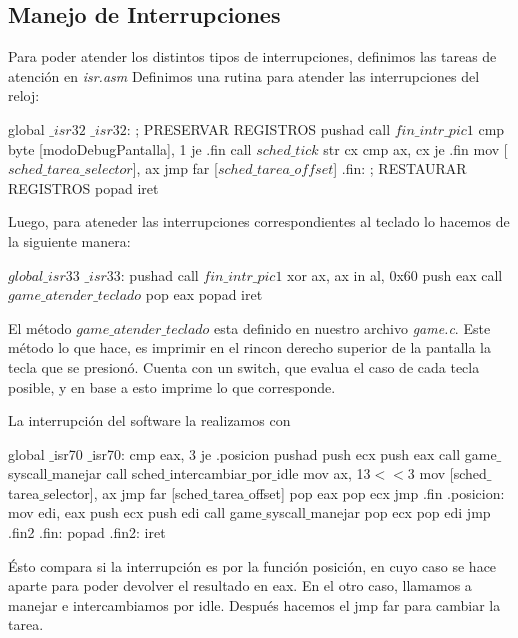 \subsection{Manejo de Interrupciones}
Para poder atender los distintos tipos de interrupciones, definimos las tareas de atenci\'on en \textit{isr.asm}
Definimos una rutina para atender las interrupciones del reloj:
\begin{algorithmic}
    \State \tab global $\_isr32$
\State \tab $\_isr32$:
  \State \tab \tab; PRESERVAR REGISTROS
  \State \tab \tab pushad
  \State \tab \tab call $fin\_intr\_pic1$
  \State \tab \tab cmp byte [modoDebugPantalla], 1
  \State \tab \tab je .fin
\State \tab \tab  call $sched\_tick$
  \State \tab \tab str cx
  \State \tab \tab cmp ax, cx
  \State \tab \tab je .fin
  \State \tab \tab mov [$sched\_tarea\_selector$], ax
  \State \tab \tab jmp far [$sched\_tarea\_offset$]
\State \tab \tab .fin:
  \State \tab \tab ; RESTAURAR REGISTROS
  \State \tab \tab popad
  \State \tab \tab iret
\end{algorithmic}

Luego, para ateneder las interrupciones correspondientes al teclado lo hacemos de la siguiente manera:
\begin{algorithmic}
    \State \tab $global \_isr33$
\State \tab \tab $\_isr33$:
  \State \tab \tab pushad
  \State \tab \tab call $fin\_intr\_pic1$
  \State \tab \tab xor ax, ax
  \State \tab \tab in al, 0x60
  \State \tab \tab push eax
  \State \tab \tab call $game\_atender\_teclado$
  \State \tab \tab pop eax
  \State \tab \tab popad
  \State \tab \tab iret
\end{algorithmic}

El m\'etodo \textit{$game\_atender\_teclado$} esta definido en nuestro archivo \textit{game.c}. Este m\'etodo lo que hace, es imprimir en el rincon derecho superior de la pantalla la tecla que se presion\'o.
Cuenta con un switch, que evalua el caso de cada tecla posible, y en base a esto imprime lo que corresponde.

La interrupción del software la realizamos con
\begin{algorithmic}
\State global $\_$isr70
\State $\_$isr70:
\State \tab cmp eax, 3
\State \tab je .posicion
\State \tab pushad
\State \tab push ecx
\State \tab push eax
\State \tab call game$\_$syscall$\_$manejar
\State \tab call sched$\_$intercambiar$\_$por$\_$idle
\State \tab mov ax, 13$<<$3
\State \tab mov [sched$\_$tarea$\_$selector], ax
\State \tab jmp far [sched$\_$tarea$\_$offset]
\State \tab pop eax
\State \tab pop ecx
\State \tab jmp .fin
\State .posicion:
\State \tab mov edi, eax
\State \tab push ecx
\State \tab push edi
\State \tab call game$\_$syscall$\_$manejar
\State \tab pop ecx
\State \tab pop edi
\State \tab jmp .fin2
\State .fin:
\State \tab popad
\State .fin2:
\State \tab iret
\end{algorithmic}
Ésto compara si la interrupción es por la función posición, en cuyo caso se hace aparte para poder devolver el resultado en eax. En el otro caso, llamamos a manejar e intercambiamos por idle. Después hacemos el jmp far para cambiar la tarea.

